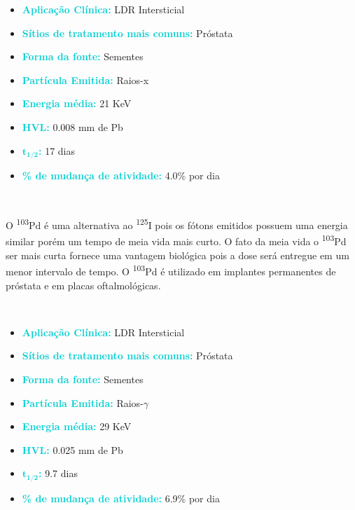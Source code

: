 \documentclass[11pt,a4paper]{article}
\begin{document}
		\begin{tcolorbox}[width=\textwidth, colback={white}, colbacktitle={DarkTurquoise!50!white}, title={$\bigstar$ \LobsterTwo{Paládio 103} $\bigstar$}, coltitle={CarnationPink}, colframe={DarkTurquoise}, fonttitle=\rmfamily\bfseries\Large, breakable]	
			\begin{itemize}
				\item \textcolor{DarkTurquoise}{\textbf{Aplicação Clínica:}} LDR Intersticial
				\item \textcolor{DarkTurquoise}{\textbf{Sítios de tratamento mais comuns:}} Próstata
				\item \textcolor{DarkTurquoise}{\textbf{Forma da fonte:}} Sementes
				\item \textcolor{DarkTurquoise}{\textbf{Partícula Emitida:}} Raios-x
				\item \textcolor{DarkTurquoise}{\textbf{Energia média:}} 21 KeV
				\item \textcolor{DarkTurquoise}{\textbf{HVL:}} 0.008 mm de Pb
				\item \textcolor{DarkTurquoise}{\textbf{$\mathbf{t_{1/2}}$:}} 17 dias
				\item \textcolor{DarkTurquoise}{\textbf{\% de mudança de atividade:}} 4.0\% por dia
			\end{itemize}
		\end{tcolorbox}
			\

			O \textsuperscript{103}Pd é uma alternativa ao \textsuperscript{125}I pois os fótons emitidos possuem uma energia similar porém um tempo de meia vida mais curto. O fato da meia vida o \textsuperscript{103}Pd ser mais curta fornece uma vantagem biológica pois a dose será entregue em um menor intervalo de tempo. O \textsuperscript{103}Pd é utilizado em implantes permanentes de próstata e em placas oftalmológicas.

			\

		
		\begin{tcolorbox}[width=\textwidth, colback={white}, colbacktitle={DarkTurquoise!50!white}, title={$\bigstar$ \LobsterTwo{Césio 131} $\bigstar$}, coltitle={CarnationPink}, colframe={DarkTurquoise}, fonttitle=\rmfamily\bfseries\Large, breakable]	
			\begin{itemize}
				\item \textcolor{DarkTurquoise}{\textbf{Aplicação Clínica:}} LDR Intersticial
				\item \textcolor{DarkTurquoise}{\textbf{Sítios de tratamento mais comuns:}} Próstata
				\item \textcolor{DarkTurquoise}{\textbf{Forma da fonte:}} Sementes
				\item \textcolor{DarkTurquoise}{\textbf{Partícula Emitida:}} Raios-$\gamma$
				\item \textcolor{DarkTurquoise}{\textbf{Energia média:}} 29 KeV
				\item \textcolor{DarkTurquoise}{\textbf{HVL:}} 0.025 mm de Pb
				\item \textcolor{DarkTurquoise}{\textbf{$\mathbf{t_{1/2}}$:}} 9.7 dias
				\item \textcolor{DarkTurquoise}{\textbf{\% de mudança de atividade:}} 6.9\% por dia
			\end{itemize}
		\end{tcolorbox}
			\
\end{document}
